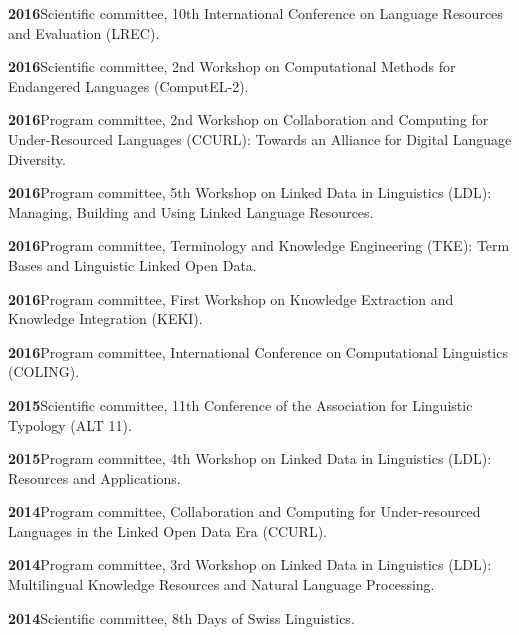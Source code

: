 \documentclass[11pt]{article}
\newcommand{\hangpara}{
 \setlength{\parindent}{0in} %
 \hangindent=0.42in %
}
\begin{document}
\vskip 6pt
\hangpara
{\bf 2016}\hspace{1ex}Scientific committee, 10th International Conference on Language Resources and Evaluation (LREC).

\vskip 6pt
\hangpara
{\bf 2016}\hspace{1ex}Scientific committee, 2nd Workshop on Computational Methods for Endangered Languages (ComputEL-2).

\vskip 6pt
\hangpara
{\bf 2016}\hspace{1ex}Program committee, 2nd Workshop on Collaboration and Computing for Under-Resourced Languages (CCURL): Towards an Alliance for Digital Language Diversity.

\vskip 6pt
\hangpara
{\bf 2016}\hspace{1ex}Program committee, 5th Workshop on Linked Data in Linguistics (LDL): Managing, Building and Using Linked Language Resources.

\vskip 6pt
\hangpara
{\bf 2016}\hspace{1ex}Program committee, Terminology and Knowledge Engineering (TKE): Term Bases and Linguistic Linked Open Data.

\vskip 6pt
\hangpara
{\bf 2016}\hspace{1ex}Program committee, First Workshop on Knowledge Extraction and Knowledge Integration (KEKI).

\vskip 6pt
\hangpara
{\bf 2016}\hspace{1ex}Program committee, International Conference on Computational Linguistics (COLING).

\vskip 6pt
\hangpara
{\bf 2015}\hspace{1ex}Scientific committee, 11th Conference of the Association for Linguistic Typology (ALT 11).

\vskip 6pt
\hangpara
{\bf 2015}\hspace{1ex}Program committee, 4th Workshop on Linked Data in Linguistics (LDL): Resources and Applications.

\vskip 6pt
\hangpara
{\bf 2014}\hspace{1ex}Program committee, Collaboration and Computing for Under-resourced Languages in the Linked Open Data Era (CCURL).

\vskip 6pt
\hangpara
{\bf 2014}\hspace{1ex}Program committee, 3rd Workshop on Linked Data in Linguistics (LDL): Multilingual Knowledge Resources and Natural Language Processing.

\vskip 6pt
\hangpara
{\bf 2014}\hspace{1ex}Scientific committee, 8th Days of Swiss Linguistics.
\end{document}
